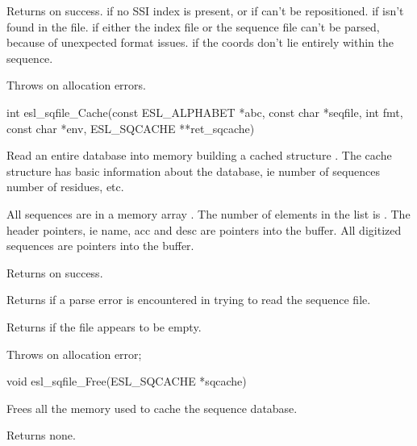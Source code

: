 \begin{sreapi}
Returns  on success.
 if no SSI index is present, or if  can't
be repositioned.
 if  isn't found in the file.
 if either the index file or the sequence file
can't be parsed, because of unexpected format issues.
 if the  coords don't lie entirely
within the  sequence.

Throws  on allocation errors.


\hypertarget{func:esl_sqfile_Cache()}
{\item[int esl\_sqfile\_Cache(const ESL\_ALPHABET *abc, const char *seqfile, int fmt, const char *env, ESL\_SQCACHE **ret\_sqcache)]}

Read an entire database into memory building a cached
structure .  The cache structure has basic
information about the database, ie number of sequences
number of residues, etc.

All sequences  are in a memory array .
The number of elements in the list is .  The
header pointers, ie name, acc and desc are pointers into
the  buffer.  All digitized sequences are pointers
into the  buffer.

Returns  on success.

Returns  if a parse error is encountered in
trying to read the sequence file.

Returns  if the file appears to be empty.

Throws  on allocation error;


\hypertarget{func:esl_sqfile_Free()}
{\item[void esl\_sqfile\_Free(ESL\_SQCACHE *sqcache)]}

Frees all the memory used to cache the sequence database.

Returns none.


\end{sreapi}

